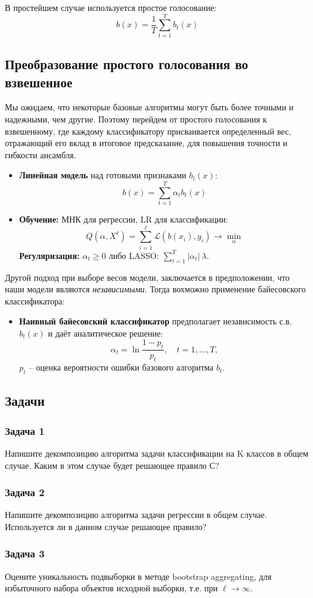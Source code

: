 В простейшем случае используется простое голосование:
$$b(x) = \frac{1}{T} \sum_{t=1}^T  b_t(x)$$

\subsection*{Преобразование простого голосования во взвешенное}
Мы ожидаем, что некоторые базовые алгоритмы могут быть более точными и надежными, чем другие. Поэтому перейдем от простого голосования к взвешенному, где каждому классификатору присваивается определенный вес, отражающий его вклад в итоговое предсказание, для повышения точности и гибкости ансамбля.
\begin{itemize}
    \item \textbf{Линейная модель} над готовыми признаками $b_t(x)$:
    $$b(x) = \sum_{t=1}^T \alpha_t b_t(x)$$
    \item \textbf{Обучение:} МНК для регрессии, LR для классификации: 
    $$Q(\alpha, X^\ell) = \sum_{i=1}^\ell \mathcal{L}(b(x_i), y_i) \to \min_\alpha$$
    \textbf{Регуляризация:} $\alpha_t \ge 0$ либо LASSO: $\sum_{t=1}^T |\alpha_t| \
    \lambda$. 
\end{itemize}
Другой подход при выборе весов модели, заключается в предположении, что наши модели являются \textit{независимыми}. Тогда вохможно применение байесовского классификатора:
\begin{itemize}
    \item \textbf{Наивный байесовский классификатор} предполагает независимость с.в. $b_t(x)$ и даёт аналитическое решение: 
    $$\alpha_t = \ln \frac{1 - p_t}{p_t}, \quad t = 1, \dots, T,$$
    $p_t$ – оценка вероятности ошибки базового алгоритма $b_t$.
\end{itemize}




\subsection*{Задачи}
\subsubsection*{Задача 1}
Напишите декомпозицию алгоритма задачи классификации на K классов в общем случае. Каким в этом случае будет решающее правило С?
\subsubsection*{Задача 2}
Напишите декомпозицию алгоритма задачи регрессии в общем случае. Используется ли в данном случае решающее правило?
\subsubsection*{Задача 3}
Оцените уникальность подвыборки в методе bootstrap aggregating, для избыточного набора объектов исходной выборки, т.е. при $\ell \to \infty$.
